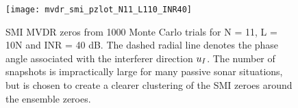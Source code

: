 
\begin{figure}[!hp]
  \centering
  \texttt{[image: mvdr\_smi\_pzlot\_N11\_L110\_INR40]}
  \caption[SMI MVDR zeros from 1000 Monte Carlo trials for N = 11, L =
  10 N and INR = $40$ dB]{SMI MVDR zeros from 1000 Monte Carlo trials
    for N = 11, L = 10N and INR = 40 dB. The dashed radial line
    denotes the phase angle associated with the interferer direction
    $u_I$. The number of snapshots is impractically large for many
    passive sonar situations, but is chosen to create a clearer
    clustering of the SMI zeroes around the ensemble zeroes.}
  \label{fig:smi-mvdr-pzplot}
\end{figure}

